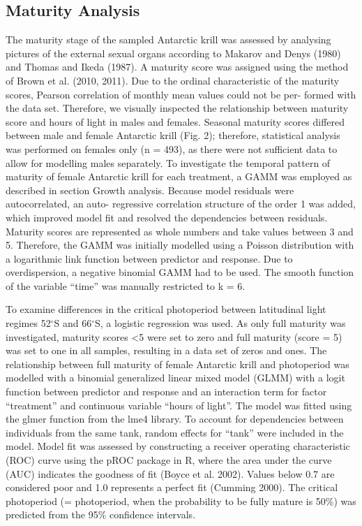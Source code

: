 \subsection{Maturity Analysis}
The maturity stage of the sampled Antarctic krill was assessed by analysing pictures of the external sexual organs according to Makarov and Denys (1980) and Thomas and Ikeda (1987). A maturity score was assigned using the method of Brown et al. (2010, 2011). Due to the ordinal characteristic of the maturity scores, Pearson correlation of monthly mean values could not be per- formed with the data set. Therefore, we visually inspected the relationship between maturity score and hours of light in males and females. Seasonal maturity scores differed between male and female Antarctic krill (Fig. 2); therefore, statistical analysis was performed on females only (n = 493), as there were not sufficient data to allow for modelling males separately. To investigate the temporal pattern of maturity of female Antarctic krill for each treatment, a GAMM was employed as described in section Growth analysis. Because model residuals were autocorrelated, an auto- regressive correlation structure of the order 1 was added, which improved model fit and resolved the dependencies between residuals. Maturity scores are represented as whole numbers and take values between 3 and 5. Therefore, the GAMM was initially modelled using a Poisson distribution with a logarithmic link function between predictor and response. Due to overdispersion, a negative binomial GAMM had to be used. The smooth function of the variable “time” was manually restricted to k = 6. 

To examine differences in the critical photoperiod between latitudinal light regimes 52$^{\circ}$S and 66$^{\circ}$S, a logistic regression was used. As only full maturity was investigated, maturity scores <5 were set to zero and full maturity (score = 5) was set to one in all samples, resulting in a data set of zeros and ones. The relationship between full maturity of female Antarctic krill and photoperiod was modelled with a binomial generalized linear mixed model (GLMM) with a logit function between predictor and response and an interaction term for factor “treatment” and continuous variable “hours of light”. The model was fitted using the glmer function from the lme4 library. To account for dependencies between individuals from the same tank, random effects for “tank” were included in the model. Model fit was assessed by constructing a receiver operating characteristic (ROC) curve using the pROC package in R, where the area under the curve (AUC) indicates the goodness of fit (Boyce et al. 2002). Values below 0.7 are considered poor and 1.0 represents a perfect fit (Cumming 2000). The critical photoperiod (= photoperiod, when the probability to be fully mature is 50\%) was predicted from the 95\% confidence intervals.

